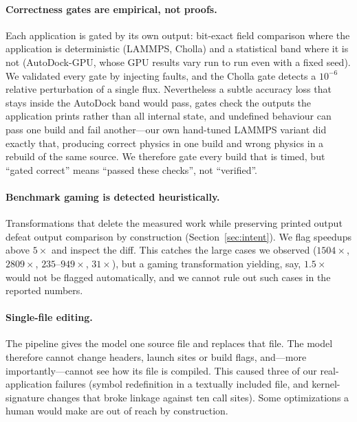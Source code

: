\paragraph{Correctness gates are empirical, not proofs.}
Each application is gated by its own output: bit-exact field comparison where the application is
deterministic (LAMMPS, Cholla) and a statistical band where it is not (AutoDock-GPU, whose GPU results
vary run to run even with a fixed seed). We validated every gate by injecting faults, and the Cholla
gate detects a $10^{-6}$ relative perturbation of a single flux. Nevertheless a subtle accuracy loss
that stays inside the AutoDock band would pass, gates check the outputs the application prints rather
than all internal state, and undefined behaviour can pass one build and fail another---our own
hand-tuned LAMMPS variant did exactly that, producing correct physics in one build and wrong physics in
a rebuild of the same source. We therefore gate every build that is timed, but ``gated correct'' means
``passed these checks'', not ``verified''.

\paragraph{Benchmark gaming is detected heuristically.}
Transformations that delete the measured work while preserving printed output defeat output comparison
by construction (Section~\ref{sec:intent}). We flag speedups above $5\times$ and inspect the diff. This
catches the large cases we observed ($1504\times$, $2809\times$, $235$--$949\times$, $31\times$), but a
gaming transformation yielding, say, $1.5\times$ would not be flagged automatically, and we cannot rule
out such cases in the reported numbers.

\paragraph{Single-file editing.}
The pipeline gives the model one source file and replaces that file. The model therefore cannot change
headers, launch sites or build flags, and---more importantly---cannot see how its file is compiled.
This caused three of our real-application failures (symbol redefinition in a textually included file,
and kernel-signature changes that broke linkage against ten call sites). Some optimizations a human
would make are out of reach by construction.

